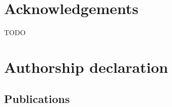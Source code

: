 \documentclass{book}
\begin{document}
\chapter*{Acknowledgements}
TODO
%
%
%
%
%
%
%
%
%
%
%
%


\chapter*{Authorship declaration}



\section*{Publications}
\end{document}
